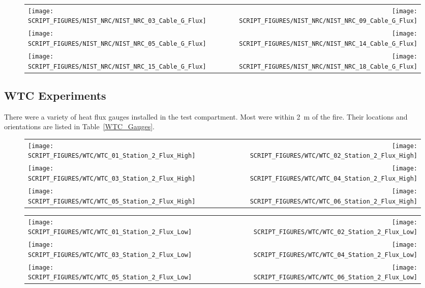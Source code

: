 \begin{figure}[p]
\begin{tabular*}{\textwidth}{l@{\extracolsep{\fill}}r}
\texttt{[image: SCRIPT\_FIGURES/NIST\_NRC/NIST\_NRC\_03\_Cable\_G\_Flux]} &
\texttt{[image: SCRIPT\_FIGURES/NIST\_NRC/NIST\_NRC\_09\_Cable\_G\_Flux]} \\
\texttt{[image: SCRIPT\_FIGURES/NIST\_NRC/NIST\_NRC\_05\_Cable\_G\_Flux]} &
\texttt{[image: SCRIPT\_FIGURES/NIST\_NRC/NIST\_NRC\_14\_Cable\_G\_Flux]} \\
\texttt{[image: SCRIPT\_FIGURES/NIST\_NRC/NIST\_NRC\_15\_Cable\_G\_Flux]} &
\texttt{[image: SCRIPT\_FIGURES/NIST\_NRC/NIST\_NRC\_18\_Cable\_G\_Flux]}
\end{tabular*}
\label{NIST_NRC_Cable_G_Flux_Open}
\end{figure}

\clearpage

\subsection{WTC Experiments}

There were a variety of heat flux gauges installed in the test compartment. Most were within 2~m of the fire. Their locations and orientations are listed in Table~\ref{WTC_Gauges}.


\begin{figure}[h!]
\begin{tabular*}{\textwidth}{l@{\extracolsep{\fill}}r}
\texttt{[image: SCRIPT\_FIGURES/WTC/WTC\_01\_Station\_2\_Flux\_High]} &
\texttt{[image: SCRIPT\_FIGURES/WTC/WTC\_02\_Station\_2\_Flux\_High]} \\
\texttt{[image: SCRIPT\_FIGURES/WTC/WTC\_03\_Station\_2\_Flux\_High]} &
\texttt{[image: SCRIPT\_FIGURES/WTC/WTC\_04\_Station\_2\_Flux\_High]} \\
\texttt{[image: SCRIPT\_FIGURES/WTC/WTC\_05\_Station\_2\_Flux\_High]} &
\texttt{[image: SCRIPT\_FIGURES/WTC/WTC\_06\_Station\_2\_Flux\_High]}
\end{tabular*}
\label{NIST_WTC_Station_2_Flux_High}
\end{figure}

\newpage

\begin{figure}[p]
\begin{tabular*}{\textwidth}{l@{\extracolsep{\fill}}r}
\texttt{[image: SCRIPT\_FIGURES/WTC/WTC\_01\_Station\_2\_Flux\_Low]} &
\texttt{[image: SCRIPT\_FIGURES/WTC/WTC\_02\_Station\_2\_Flux\_Low]} \\
\texttt{[image: SCRIPT\_FIGURES/WTC/WTC\_03\_Station\_2\_Flux\_Low]} &
\texttt{[image: SCRIPT\_FIGURES/WTC/WTC\_04\_Station\_2\_Flux\_Low]} \\
\texttt{[image: SCRIPT\_FIGURES/WTC/WTC\_05\_Station\_2\_Flux\_Low]} &
\texttt{[image: SCRIPT\_FIGURES/WTC/WTC\_06\_Station\_2\_Flux\_Low]}
\end{tabular*}
\label{NIST_WTC_Station_2_Flux_Low}
\end{figure}

